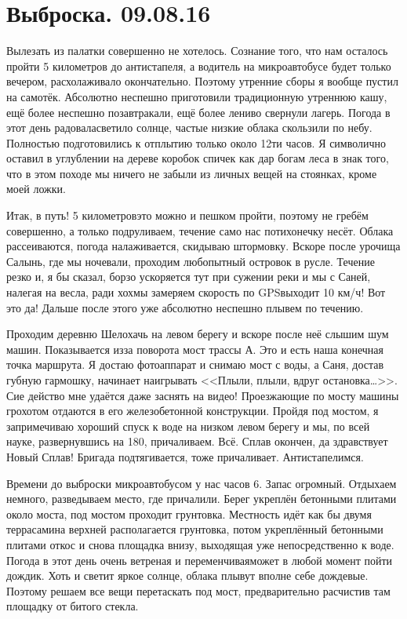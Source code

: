 \chapter{Выброска. 09.08.16} 

Вылезать из палатки совершенно не хотелось. Сознание того, что нам осталось пройти 5 километров до антистапеля, а водитель на микроавтобусе будет только вечером, расхолаживало окончательно. Поэтому утренние сборы я вообще пустил на самотёк. Абсолютно неспешно приготовили традиционную утреннюю кашу, ещё более неспешно позавтракали, ещё более лениво свернули лагерь. Погода в этот день радовала\mdash светило солнце, частые низкие облака скользили по небу. Полностью подготовились к отплытию только около 12\sdash ти часов. Я символично оставил в углублении на дереве коробок спичек как дар богам леса в знак того, что в этом походе мы ничего не забыли из личных вещей на стоянках, кроме моей ложки.

Итак, в путь! 5 километров\mdash это можно и пешком пройти, поэтому не гребём совершенно, а только подруливаем, течение само нас потихонечку несёт. Облака рассеиваются, погода налаживается, скидываю штормовку. Вскоре после урочища Салынь, где мы ночевали, проходим любопытный островок в русле. Течение резко и, я бы сказал, борзо ускоряется тут при сужении реки и мы с Саней, налегая на весла, ради хохмы замеряем скорость по GPS\mdash выходит 10 км/ч! Вот это да! Дальше после этого уже абсолютно неспешно плывем по течению. 

Проходим деревню Шелохачь на левом берегу и вскоре после неё слышим шум машин. Показывается из\sdash за поворота мост трассы А. Это и есть наша конечная точка маршрута. Я достаю фотоаппарат и снимаю мост с воды, а Саня, достав губную гармошку, начинает наигрывать <<Плыли, плыли, вдруг остановка\ldots>>. Сие действо мне удаётся даже заснять на видео! Проезжающие по мосту машины грохотом отдаются в его железобетонной конструкции. Пройдя под мостом, я запримечиваю хороший спуск к воде на низком левом берегу и мы, по всей науке, развернувшись на 180, причаливаем. Всё. Сплав окончен, да здравствует Новый Сплав! Бригада подтягивается, тоже причаливает. Антистапелимся.

Времени до выброски микроавтобусом у нас часов 6. Запас огромный. Отдыхаем немного, разведываем место, где причалили. Берег укреплён бетонными плитами около моста, под мостом проходит грунтовка. Местность идёт как бы двумя террасами\mdash на верхней располагается грунтовка, потом укреплённый бетонными плитами откос и снова площадка внизу, выходящая уже непосредственно к воде. Погода в этот день очень ветреная  и переменчивая\mdash может в любой момент пойти дождик. Хоть и светит яркое солнце, облака плывут вполне себе дождевые. Поэтому решаем все вещи перетаскать под мост, предварительно расчистив там площадку от битого стекла. 

